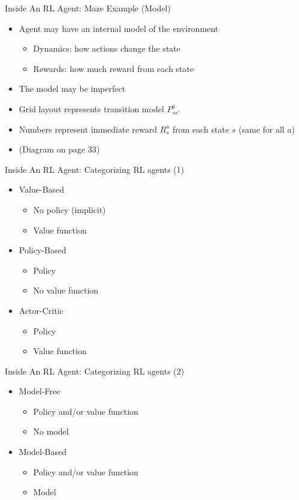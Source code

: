 \documentclass[presentation]{beamer}
\begin{document}
\begin{frame}[label={sec:orgd60440e}]{Inside An RL Agent: Maze Example (Model)}
\begin{itemize}
\item Agent may have an internal model of the environment
\begin{itemize}
\item Dynamics: how actions change the state
\item Rewards: how much reward from each state
\end{itemize}
\item The model may be imperfect
\item Grid layout represents transition model \(P^a_{ss'}\)
\item Numbers represent immediate reward \(R^a_s\) from each state \(s\) (same for all \(a\))
\item (Diagram on page 33)
\end{itemize}
\end{frame}
\begin{frame}[label={sec:org83d341a}]{Inside An RL Agent: Categorizing RL agents (1)}
\begin{itemize}
\item Value-Based
\begin{itemize}
\item No policy (implicit)
\item Value function
\end{itemize}
\item Policy-Based
\begin{itemize}
\item Policy
\item No value function
\end{itemize}
\item Actor-Critic
\begin{itemize}
\item Policy
\item Value function
\end{itemize}
\end{itemize}
\end{frame}
\begin{frame}[label={sec:orgcb98c46}]{Inside An RL Agent: Categorizing RL agents (2)}
\begin{itemize}
\item Model-Free
\begin{itemize}
\item Policy and/or value function
\item No model
\end{itemize}
\item Model-Based
\begin{itemize}
\item Policy and/or value function
\item Model
\end{itemize}
\end{itemize}
\end{frame}
\end{document}
